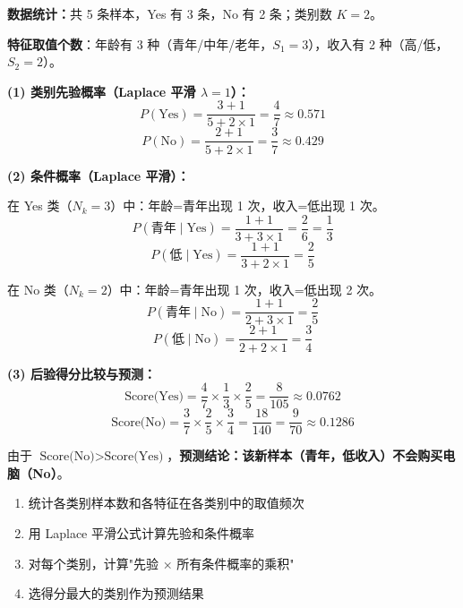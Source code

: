 \documentclass[a4paper,11pt]{ctexart}
\begin{document}
\begin{solutionbox}[参考答案与详细解析]
    \textbf{数据统计：}共 5 条样本，Yes 有 3 条，No 有 2 条；类别数 $K=2$。

    \textbf{特征取值个数}：年龄有 3 种（青年/中年/老年，$S_1=3$），收入有 2 种（高/低，$S_2=2$）。

    \vspace{0.5em}
    \textbf{(1) 类别先验概率（Laplace 平滑 $\lambda=1$）：}
    \[
    P(\text{Yes}) = \frac{3 + 1}{5 + 2 \times 1} = \frac{4}{7} \approx 0.571
    \]
    \[
    P(\text{No}) = \frac{2 + 1}{5 + 2 \times 1} = \frac{3}{7} \approx 0.429
    \]

    \textbf{(2) 条件概率（Laplace 平滑）：}

    在 Yes 类（$N_k=3$）中：年龄=青年出现 1 次，收入=低出现 1 次。
    \[
    P(\text{青年} \mid \text{Yes}) = \frac{1+1}{3+3\times1} = \frac{2}{6} = \frac{1}{3}
    \]
    \[
    P(\text{低} \mid \text{Yes}) = \frac{1+1}{3+2\times1} = \frac{2}{5}
    \]

    在 No 类（$N_k=2$）中：年龄=青年出现 1 次，收入=低出现 2 次。
    \[
    P(\text{青年} \mid \text{No}) = \frac{1+1}{2+3\times1} = \frac{2}{5}
    \]
    \[
    P(\text{低} \mid \text{No}) = \frac{2+1}{2+2\times1} = \frac{3}{4}
    \]

    \textbf{(3) 后验得分比较与预测：}
    \[
    \text{Score(Yes)} = \frac{4}{7} \times \frac{1}{3} \times \frac{2}{5} = \frac{8}{105} \approx 0.0762
    \]
    \[
    \text{Score(No)} = \frac{3}{7} \times \frac{2}{5} \times \frac{3}{4} = \frac{18}{140} = \frac{9}{70} \approx 0.1286
    \]

    由于 $\text{Score(No)} > \text{Score(Yes)}$，\textbf{预测结论：该新样本（青年，低收入）不会购买电脑（No）}。

    \begin{keybox}[计算流程小结]
        \begin{enumerate}
            \item 统计各类别样本数和各特征在各类别中的取值频次
            \item 用 Laplace 平滑公式计算先验和条件概率
            \item 对每个类别，计算"先验 × 所有条件概率的乘积"
            \item 选得分最大的类别作为预测结果
        \end{enumerate}
    \end{keybox}
\end{solutionbox}
\end{document}

